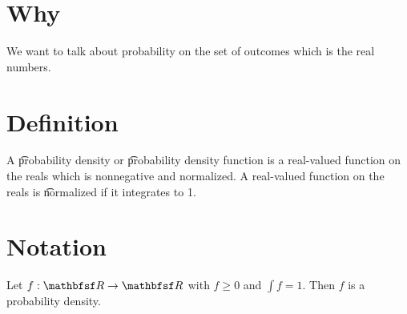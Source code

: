 
\section*{Why}

We want to talk about probability on the set of outcomes which is the real numbers.

\section*{Definition}

A \t{probability density} or \t{probability density function} is a real-valued function on the reals which is nonnegative and normalized.
A real-valued function on the reals is \t{normalized} if it integrates to 1.


\section*{Notation}

Let $f: \R  \to \R $ with $f \geq 0$ and $\int f = 1$.
Then $f$ is a probability density.

\blankpage